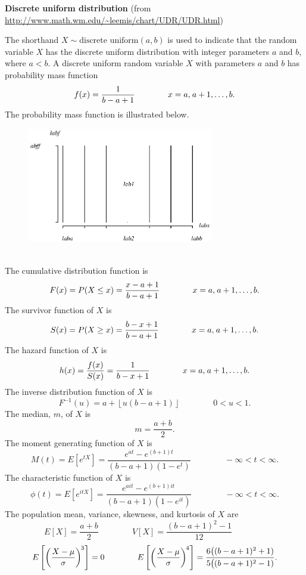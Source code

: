 \documentclass[12pt,fullpage]{article}
\begin{document}
\noindent
{\bf Discrete uniform distribution} (from \color{blue}\url{http://www.math.wm.edu/~leemis/chart/UDR/UDR.html}\color{black})

\noindent
The shorthand $X \sim \textrm{discrete uniform}(a,b)$ is used to indicate that the
random variable $X$ has the discrete uniform distribution with integer parameters $a$ and $b$, where  $a<b$.
A discrete uniform random variable $X$ with parameters $a$ and $b$ has probability mass function 
$$
f(x) = \frac{1}{b-a+1} \qquad \qquad x=a, \kern 0.08 em a+1, \ldots, b.
$$
The probability mass function is illustrated below.
{\begin{figure}[h!]
\begin{center}
\includegraphics[width=3.2in]{DiscreteuniformPlot.ps}
\end{center}
\end{figure}}\\
The cumulative distribution function is
$$
F(x) = P(X \le x) = \frac{x-a+1}{b-a+1} \qquad \qquad x=a, \kern 0.08 em a+1, \ldots ,b.\\
$$
The survivor function of $X$ is
$$
S(x) = P(X \ge x) = \frac{b-x+1}{b-a+1} \qquad \qquad x=a, \kern 0.08 em a+1, \ldots ,b.\\
$$
The hazard function of $X$ is
$$
h(x) = \frac{f(x)}{S(x)} = \frac{1}{b-x+1} \qquad \qquad x=a,\kern 0.08 em  a+1, \ldots ,b.\\
$$
The inverse distribution function of $X$ is
$$
F ^ {-1}(u) = a+ \left\lfloor u(b-a+1) \right\rfloor \qquad \qquad 0 < u < 1.
$$
The median, $m$, of $X$ is
$$
m = \frac{a+b}{2}.
$$
The moment generating function of $X$ is
$$
M(t) = E\left[ e ^ {tX} \right] = \frac{e^{at}-e^{(b+1)t}}{(b-a+1)(1-e^{t})} \qquad \qquad -\infty < t < \infty.
$$
The characteristic function of $X$ is
$$
\phi(t) = E\left[ e ^ {itX} \right] =  \frac{e^{ait}-e^{(b+1)it}}{(b-a+1)(1-e^{it})} \qquad \qquad -\infty < t < \infty.
$$
The population mean, variance, skewness, and kurtosis of $X$ are
$$
E[X] = \frac{a+b}{2} \qquad \qquad 
V[X] = \frac{(b-a+1)^{2}-1}{12} \qquad \qquad
$$
$$
E\left[ \left( \frac{X - \mu}{\sigma} \right) ^ {\kern -0.08 em 3} \right] = 0 \qquad \qquad 
E\left[ \left( \frac{X - \mu}{\sigma} \right) ^ {\kern -0.08 em 4} \right] = \frac{6\big((b-a+1)^{2}+1)}{5\big((b-a+1)^{2}-1)}.
$$
\vspace{0.1in}
\end{document}
